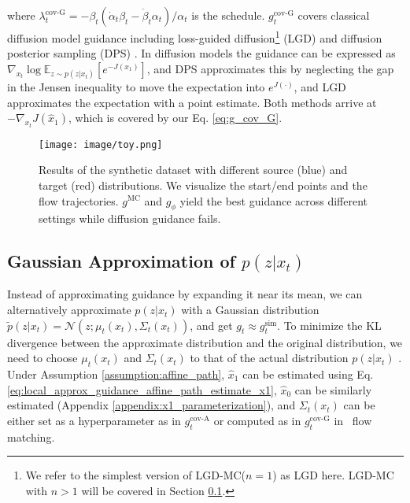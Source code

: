 where $\lambda^{\text{cov-G}}_t = -{\beta_t(\dot\alpha_t\beta_t - \dot\beta_t\alpha_t)}/{\alpha_t}$ is the schedule. 
$g_t^{\text{cov-G}}$ covers classical diffusion model guidance including loss-guided diffusion\footnote{We refer to the simplest version of LGD-MC($n=1$) as LGD here. LGD-MC with $n>1$ will be covered in Section \ref{sec:method_approximate_simple_posterior}.} (LGD) \citep{song_loss-guided_2023} and diffusion posterior sampling (DPS) \citep{chung_diffusion_2024}. In diffusion models the guidance can be expressed as $\nabla_{x_t} \log \mathbb{E}_{z\sim p(z|x_t)}[e^{-J(x_1)}]$, and DPS approximates this by neglecting the gap in the Jensen inequality \citep{chung_diffusion_2024} to move the expectation into $e^{J(\cdot)}$, and LGD approximates the expectation with a point estimate. Both methods arrive at $-\nabla_{x_t}J(\hat{x}_1)$, which is covered by our Eq. \eqref{eq:g_cov_G}. 


















\begin{figure*}[htb]
    \centering
    \vspace{-5pt}
    \texttt{[image: image/toy.png]}
    \vspace{-7pt}
    \caption{Results of the synthetic dataset with different source (blue) and target (red) distributions. We visualize the start/end points and the flow trajectories. $g^{\text{MC}}$ and $g_\phi$ yield the best guidance across different settings while diffusion guidance fails.}
    \label{fig:toy}
    \vspace{-7pt}
\end{figure*}


\subsection{Gaussian Approximation of $p(z|x_t)$}\label{sec:method_approximate_simple_posterior}

Instead of approximating guidance by expanding it near its mean, we can alternatively approximate
 $p(z|x_t)$ with a Gaussian distribution $\tilde p(z|x_t)=\mathcal{N}(z;\mu_t(x_t),\Sigma_t(x_t))$, and get $g_t\approx g_t^{\text{sim}}$.
To minimize the KL divergence between the approximate distribution and the original distribution, we need to choose $\mu_t(x_t)$ and $\Sigma_t(x_t)$ to that of the actual distribution $p(z|x_t)$ \citep{rozet_learning_2024,boys_tweedie_2024}. Under Assumption \ref{assumption:affine_path}, $\hat{x}_1$ can be estimated using Eq. \eqref{eq:local_approx_guidance_affine_path_estimate_x1}, $\hat{x}_0$ can be similarly estimated (Appendix \ref{appendix:x1_parameterization}), and $\Sigma_t(x_t)$ can be either set as a hyperparameter as in $g_t^{\text{cov-A}}$ or computed as in $g_t^{\text{cov-G}}$ in \diffusionpath~flow matching.

